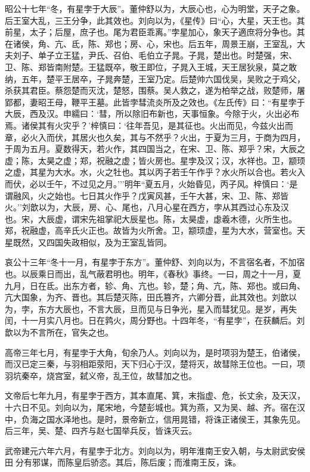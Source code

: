 \documentclass[]{article}
\begin{document}
昭公十七年``冬，有星孛于大辰''。董仲舒以为，大辰心也，心为明堂，天子之象。后王室大乱，三王分争，此其效也。刘向以为，《星传》曰``心，大星，天王也。其前星，太子；后屋，庶子也。尾为君臣乖离。''孛星加心，象天子適庶将分争也。其在诸侯，角、亢、氐，陈、郑也；房、心，宋也。后五年，周景王崩，王室乱，大夫刘子、单子立王猛，尹氏、召伯、毛伯立子晁。子晁，楚出也。时楚强，宋、卫、陈、郑皆南附楚。王猛既卒，敬王即位，子晁入王城，天王居狄泉，莫之敢纳，五年，楚平王居卒，子晁奔楚，王室乃定。后楚帅六国伐吴，吴败之于鸡父，杀获其君臣。蔡怨楚而灭沈，楚怒，围蔡。吴人救之，遂为柏举之战，败楚师，屠郢都，妻昭王母，鞭平王墓。此皆孛彗流炎所及之效也。《左氏传》曰：``有星孛于大辰，西及汉。申繻曰：`彗，所以除旧布新也，天事恒象。今除于火，火出必布焉。诸侯其有火灾乎？'梓慎曰：`往年吾见，是其征也。火出而见，今兹火出而章，必火入而伏，其居火也久矣，其与不然乎？火出，于夏为三月，于商为四月，于周为五月。夏数得天，若火作，其四国当之，在宋、卫、陈、郑乎？宋，大辰之虚；陈，太昊之虚；郑，祝融之虚；皆火房也。星孛及汉；汉，水祥也。卫，颛顼之虚，其星为大水。水，火之牡也。其以丙子若壬午作乎？水火所以合也。若火入而伏，必以壬午，不过见之月。'''明年``夏五月，火始昏见，丙子风。梓慎曰：`是谓融风，火之始也。七日其火作乎？戊寅风甚，壬午大甚，宋、卫、陈、郑皆火。''刘歆以为，大辰，房、心、尾也，八月心星在西方，孛从其西过心东及汉也。宋，大辰虚，谓宋先祖掌祀大辰星也。陈，太昊虚，虙羲木德，火所生也。郑，祝融虚，高辛氏火正也。故皆为火所舍。卫，颛顼虚，星为大水，营室也。天星既然，又四国失政相似，及为王室乱皆同。

哀公十三年``冬十一月，有星孛于东方''。董仲舒、刘向以为，不言宿名者，不加宿也。以辰乘日而出，乱气蔽君明也。明年，《春秋》事终。一曰，周之十一月，夏九月，日在氐。出东方者，轸、角、亢也。轸，楚；角、亢，陈、郑也。或曰角、亢大国象，为齐、晋也。其后楚灭陈，田氏篡齐，六卿分晋，此其效也。刘歆以为，孛，东方大辰也，不言大辰，旦而见与日争光，星入而彗犹见。是岁，再失闰，十一月实八月也。日在鹑火，周分野也。十四年冬，``有星孛''，在获麟后。刘歆以为不言所在，官失之也。

高帝三年七月，有星孛于大角，旬余乃人。刘向以为，是时项羽为楚王，伯诸侯，而汉已定三秦，与羽相距荥阳，天下归心于汉，楚将灭，故彗除王位也。一曰，项羽坑秦卒，烧宫室，弑义帝，乱王位，故彗加之也。

文帝后七年九月，有星孛于西方，其本直尾、箕，末指虚、危，长丈余，及天汉，十六日不见。刘向以为，尾宋地，今楚彭城也。箕为燕，又为吴、越、齐。宿在汉中，负海之国水泽地也。是时，景帝新立，信用晁错，将诛正诸侯王，其象先见。后三年，吴、楚、四齐与赵七国举兵反，皆诛灭云。

武帝建元六年六月，有星孛于北方。刘向以为，明年淮南王安入朝，与太尉武安侯田分有邪谋，而陈皇后骄恣。其后，陈后废；而淮南王反，诛。
\end{document}
